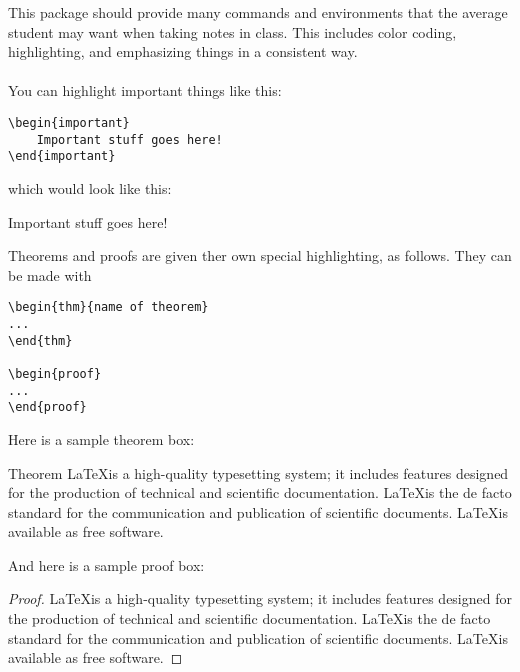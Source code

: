 \documentclass{notes}
\date{\today}
\begin{document}
This package should provide many commands and environments that the average student may want when taking notes in class. This includes color coding, highlighting, and emphasizing things in a consistent way.
\\
\\
You can highlight important things like this:

\begin{verbatim}
\begin{important}
    Important stuff goes here!
\end{important}
\end{verbatim}

which would look like this:

\begin{important}
    Important stuff goes here!
\end{important}

Theorems and proofs are given ther own special highlighting, as follows. They can be made with
\begin{verbatim}
\begin{thm}{name of theorem}
...
\end{thm}

\begin{proof}
...
\end{proof}
\end{verbatim}
Here is a sample theorem box:
\begin{thm}{Theorem}
\LaTeX is a high-quality typesetting system; it includes features designed for the production of technical and scientific documentation. \LaTeX is the de facto standard for the communication and publication of scientific documents. \LaTeX is available as free software. 
\end{thm}
And here is a sample proof box:
\begin{proof}
\LaTeX is a high-quality typesetting system; it includes features designed for the production of technical and scientific documentation. \LaTeX is the de facto standard for the communication and publication of scientific documents. \LaTeX is available as free software. 
\end{proof}
\end{document}
